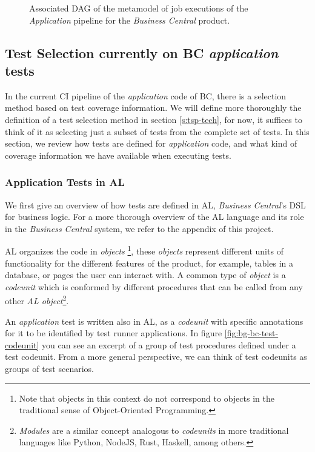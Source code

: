 \begin{figure}
    \centering
    \def\svgscale{0.1}
    
    \caption{Associated DAG of the metamodel of job executions of the \emph{Application} pipeline for the \emph{Business Central} product.}
    \label{fig:full-job-metamodel-dag}
\end{figure}

\subsection{Test Selection currently on BC \emph{application} tests}
\label{sec:bg-bc-test-selection-currently}

In the current CI pipeline of the \emph{application} code of BC, there is 
a selection method based on test coverage information. We will
define more thoroughly the definition of a test selection method in section \ref{s:tsp-tech},
for now, it suffices to think of it as selecting just a subset of tests from the complete
set of tests. In this section, we review how tests are defined for \emph{application} code, and what kind
of coverage information we have available when executing tests.

\subsubsection{Application Tests in AL}\label{sec:app-tests-al}
We first give an overview of how tests are defined in AL, \emph{Business Central}'s DSL for business logic.  
For a more thorough overview of the AL language and its role in the \emph{Business Central} system, 
we refer to the appendix of this project.

AL organizes the code in \emph{objects} \footnote{Note that objects in this context do not 
correspond to objects in the traditional sense of Object-Oriented Programming.}, these
\emph{objects} represent different units of functionality for the different features of the
product, for example, tables in a database, or pages the user can interact with. A common 
type of \emph{object} is a \emph{codeunit} which is conformed by different procedures that
can be called from any other \emph{AL object}\footnote{\emph{Modules} are a similar concept analogous
to \emph{codeunits} in more traditional languages like Python, NodeJS, Rust, Haskell, among others.}.

An \emph{application} test is written also in AL, as a \emph{codeunit} with specific annotations for it to 
be identified by test runner applications. In figure \ref{fig:bg-bc-test-codeunit} you can see
an excerpt of a group of test procedures defined under a test codeunit. From a more general perspective, 
we can think of test codeunits as groups of test scenarios.

